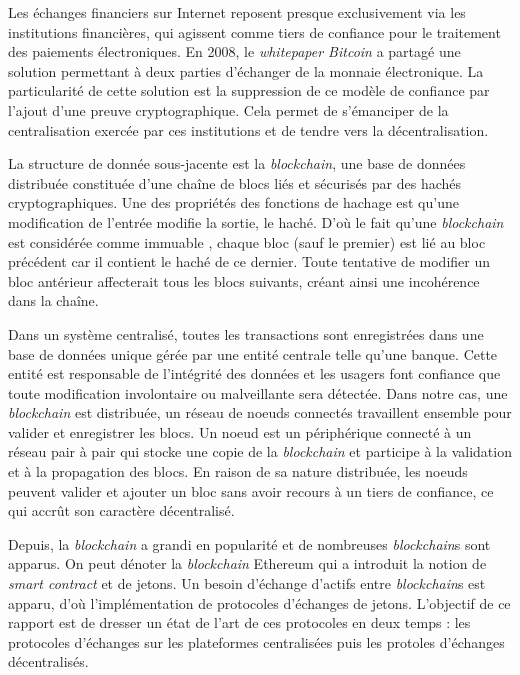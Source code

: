 Les échanges financiers sur Internet reposent presque exclusivement via les institutions financières, qui
agissent comme tiers de confiance pour le traitement des paiements électroniques.
En 2008, le \textit{whitepaper Bitcoin} a partagé une solution permettant à deux parties d'échanger de
la monnaie électronique. La particularité de cette solution est la suppression de ce modèle de confiance par
l'ajout d'une preuve cryptographique. Cela permet de s'émanciper de la centralisation exercée par ces 
institutions et de tendre vers la décentralisation.

La structure de donnée sous-jacente est la \textit{\gls{blockchain}}, une base de données distribuée constituée 
d’une chaîne de blocs liés et sécurisés par des hachés cryptographiques. Une des propriétés des fonctions de hachage 
est qu'une modification de l'entrée modifie la sortie, le haché.
D'où le fait qu'une \textit{\gls{blockchain}} est considérée comme immuable , chaque bloc (sauf le premier) 
est lié au bloc précédent car il contient le haché de ce dernier. Toute tentative de modifier un bloc antérieur 
affecterait tous les blocs suivants, créant ainsi une incohérence dans la chaîne.

Dans un système centralisé, toutes les transactions sont enregistrées dans une base de données unique gérée 
par une entité centrale telle qu'une banque. Cette entité est responsable de l'intégrité des données
et les usagers font confiance que toute modification involontaire ou malveillante sera détectée. 
Dans notre cas, une \textit{\gls{blockchain}} est distribuée, un réseau de noeuds connectés travaillent ensemble pour valider et enregistrer les blocs. 
Un noeud est un périphérique connecté à un réseau pair à pair qui stocke une copie de la \textit{\gls{blockchain}} et participe à la validation 
et à la propagation des blocs. En raison de sa nature distribuée, les noeuds peuvent valider et ajouter un bloc sans avoir 
recours à un tiers de confiance, ce qui accrût son caractère décentralisé.

 Depuis, la \textit{\gls{blockchain}} a grandi en popularité et de nombreuses \textit{\gls{blockchain}}s sont apparus.
On peut dénoter la \textit{\gls{blockchain}} Ethereum qui a introduit la notion de \textit{\gls{smart contract}} et de jetons.
Un besoin d'échange d'actifs entre \textit{\gls{blockchain}}s est apparu, d'où l'implémentation de protocoles 
d'échanges de jetons. L'objectif de ce rapport est de dresser un état de l'art de ces protocoles 
en deux temps : les protocoles d'échanges sur les plateformes centralisées puis les protoles d'échanges 
décentralisés.

